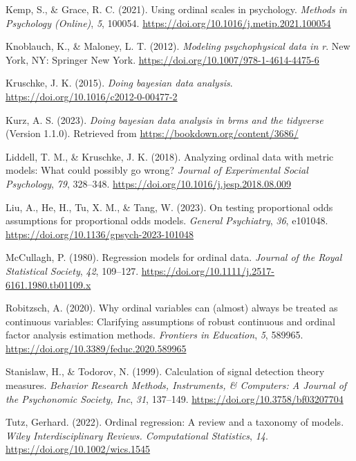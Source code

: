 \documentclass[
  man,floatsintext]{apa6}
\newlength{\cslhangindent}
\newenvironment{CSLReferences}[2] %
 {\begin{list}{}{%
  \setlength{\itemindent}{0pt}
  \setlength{\leftmargin}{0pt}
  \setlength{\parsep}{0pt}
  \ifodd #1
   \setlength{\leftmargin}{\cslhangindent}
   \setlength{\itemindent}{-1\cslhangindent}
  \fi
  \setlength{\itemsep}{#2\baselineskip}}}
 {\end{list}}
\begin{document}
\begin{CSLReferences}{1}{0}
Kemp, S., \& Grace, R. C. (2021). Using ordinal scales in psychology. \emph{Methods in Psychology (Online)}, \emph{5}, 100054. \url{https://doi.org/10.1016/j.metip.2021.100054}

Knoblauch, K., \& Maloney, L. T. (2012). \emph{Modeling psychophysical data in r}. New York, NY: Springer New York. \url{https://doi.org/10.1007/978-1-4614-4475-6}

Kruschke, J. K. (2015). \emph{Doing bayesian data analysis}. \url{https://doi.org/10.1016/c2012-0-00477-2}

Kurz, A. S. (2023). \emph{Doing bayesian data analysis in brms and the tidyverse} (Version 1.1.0). Retrieved from \url{https://bookdown.org/content/3686/}

Liddell, T. M., \& Kruschke, J. K. (2018). Analyzing ordinal data with metric models: What could possibly go wrong? \emph{Journal of Experimental Social Psychology}, \emph{79}, 328--348. \url{https://doi.org/10.1016/j.jesp.2018.08.009}

Liu, A., He, H., Tu, X. M., \& Tang, W. (2023). On testing proportional odds assumptions for proportional odds models. \emph{General Psychiatry}, \emph{36}, e101048. \url{https://doi.org/10.1136/gpsych-2023-101048}

McCullagh, P. (1980). Regression models for ordinal data. \emph{Journal of the Royal Statistical Society}, \emph{42}, 109--127. \url{https://doi.org/10.1111/j.2517-6161.1980.tb01109.x}

Robitzsch, A. (2020). Why ordinal variables can (almost) always be treated as continuous variables: Clarifying assumptions of robust continuous and ordinal factor analysis estimation methods. \emph{Frontiers in Education}, \emph{5}, 589965. \url{https://doi.org/10.3389/feduc.2020.589965}

Stanislaw, H., \& Todorov, N. (1999). Calculation of signal detection theory measures. \emph{Behavior Research Methods, Instruments, \& Computers: A Journal of the Psychonomic Society, Inc}, \emph{31}, 137--149. \url{https://doi.org/10.3758/bf03207704}

Tutz, Gerhard. (2022). Ordinal regression: A review and a taxonomy of models. \emph{Wiley Interdisciplinary Reviews. Computational Statistics}, \emph{14}. \url{https://doi.org/10.1002/wics.1545}


\end{CSLReferences}
\end{document}
